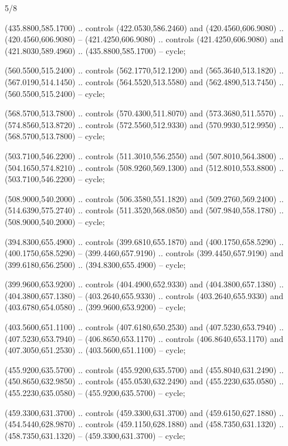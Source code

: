 \begin{flagdescription}{5/8}
\begin{scope}[shift={(m)}]
\begin{scope}[scale=\flagwidth/220,y=0.1mm, x=0.1mm, yscale=-1,shift={(-596,-360)}]
\begin{scope}[draw=black,line join=round,line cap=round,line width=0.381\lw]
\begin{scope}[fill=gold]
\end{scope}
\begin{scope}[fill=black]
 (435.8800,585.1700) .. controls (422.0530,586.2460) and
  (420.4560,606.9080) .. (420.4560,606.9080) -- (421.4250,606.9080) .. controls
  (421.4250,606.9080) and (421.8030,589.4960) .. (435.8800,585.1700) -- cycle;

 (560.5500,515.2400) .. controls (562.1770,512.1200) and
  (565.3640,513.1820) .. (567.0190,514.1450) .. controls (564.5520,513.5580) and
  (562.4890,513.7450) .. (560.5500,515.2400) -- cycle;

 (568.5700,513.7800) .. controls (570.4300,511.8070) and
  (573.3680,511.5570) .. (574.8560,513.8720) .. controls (572.5560,512.9330) and
  (570.9930,512.9950) .. (568.5700,513.7800) -- cycle;

 (503.7100,546.2200) .. controls (511.3010,556.2550) and
  (507.8010,564.3800) .. (504.1650,574.8210) .. controls (508.9260,569.1300) and
  (512.8010,553.8800) .. (503.7100,546.2200) -- cycle;

 (508.9000,540.2000) .. controls (506.3580,551.1820) and
  (509.2760,569.2400) .. (514.6390,575.2740) .. controls (511.3520,568.0850) and
  (507.9840,558.1780) .. (508.9000,540.2000) -- cycle;

 (394.8300,655.4900) .. controls (399.6810,655.1870) and
  (400.1750,658.5290) .. (400.1750,658.5290) -- (399.4460,657.9190) .. controls
  (399.4450,657.9190) and (399.6180,656.2500) .. (394.8300,655.4900) -- cycle;

 (399.9600,653.9200) .. controls (404.4900,652.9330) and
  (404.3800,657.1380) .. (404.3800,657.1380) -- (403.2640,655.9330) .. controls
  (403.2640,655.9330) and (403.6780,654.0580) .. (399.9600,653.9200) -- cycle;

 (403.5600,651.1100) .. controls (407.6180,650.2530) and
  (407.5230,653.7940) .. (407.5230,653.7940) -- (406.8650,653.1170) .. controls
  (406.8640,653.1170) and (407.3050,651.2530) .. (403.5600,651.1100) -- cycle;

 (455.9200,635.5700) .. controls (455.9200,635.5700) and
  (455.8040,631.2490) .. (450.8650,632.9850) .. controls (455.0530,632.2490) and
  (455.2230,635.0580) .. (455.2230,635.0580) -- (455.9200,635.5700) -- cycle;

 (459.3300,631.3700) .. controls (459.3300,631.3700) and
  (459.6150,627.1880) .. (454.5440,628.9870) .. controls (459.1150,628.1880) and
  (458.7350,631.1320) .. (458.7350,631.1320) -- (459.3300,631.3700) -- cycle;


\end{scope}
\end{scope}
\end{scope}
\end{scope}
\end{flagdescription}
